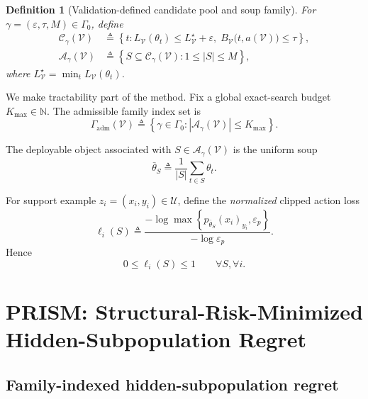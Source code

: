 \documentclass{article}
\newtheorem{definition}{Definition}
\newcommand{\cA}{\mathcal{A}}
\newcommand{\cC}{\mathcal{C}}
\newcommand{\cU}{\mathcal{U}}
\newcommand{\cV}{\mathcal{V}}
\newcommand{\braces}[1]{\left\{ #1 \right\}}
\newcommand{\loss}{\ell}
\newcommand{\1}{\mathbbm{1}}
\begin{document}
\begin{definition}[Validation-defined candidate pool and soup family]
For \(\gamma=(\varepsilon,\tau,M)\in\Gamma_0\), define
\begin{align}
    \cC_\gamma(\cV)
    &\triangleq
    \braces{
        t :
        L_{\cV}(\theta_t)\le L_{\cV}^\star + \varepsilon,\;
        B_{\cV}\!\big(t,a(\cV)\big)\le \tau
    },
    \label{eq:candidate_pool}
    \\
    \cA_\gamma(\cV)
    &\triangleq
    \braces{
        S\subseteq \cC_\gamma(\cV) :
        1\le |S|\le M
    },
    \label{eq:action_family}
 \end{align}
where \(L_{\cV}^\star=\min_t L_{\cV}(\theta_t)\).
\end{definition}

We make tractability part of the method. Fix a global exact-search budget \(K_{\max}\in\mathbb{N}\). The admissible family index set is
\begin{equation}
    \Gamma_{\mathrm{adm}}(\cV)
    \triangleq
    \braces{
        \gamma\in\Gamma_0 :
        |\cA_\gamma(\cV)| \le K_{\max}
    }.
    \label{eq:admissible_gamma}
\end{equation}

The deployable object associated with \(S\in\cA_\gamma(\cV)\) is the uniform soup
\begin{equation}
    \bar{\theta}_S
    \triangleq
    \frac{1}{|S|}
    \sum_{t\in S}\theta_t.
    \label{eq:uniform_soup}
\end{equation}

For support example \(z_i=(x_i,y_i)\in\cU\), define the \emph{normalized} clipped action loss
\begin{equation}
    \loss_i(S)
    \triangleq
    \frac{
        -\log \max\braces{p_{\bar{\theta}_S}(x_i)_{y_i},\varepsilon_p}
    }{
        -\log \varepsilon_p
    }.
    \label{eq:normalized_loss}
\end{equation}
Hence
\begin{equation}
    0 \le \loss_i(S)\le 1
    \qquad
    \forall S,\forall i.
    \label{eq:loss_bounded}
\end{equation}

\section{PRISM: Structural-Risk-Minimized Hidden-Subpopulation Regret}
\label{sec:method}

\subsection{Family-indexed hidden-subpopulation regret}
\end{document}
